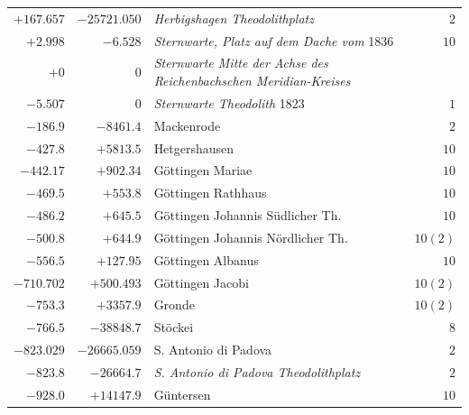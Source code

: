 \begin{center}
\begin{tabular}{r|r|p{170pt}|r}
\(+167.657\)&\(-25721.050\)&\textit{Herbigshagen Theodolithplatz}&\(2\)\\
\(+2.998\)&\(-6.528\)&\textit{Sternwarte, Platz auf dem Dache vom} 1836&\(10\)\\
\(+0\)&\(0\)&\textit{Sternwarte Mitte der Achse des Reichenbachschen Meridian-Kreises}&\\
\(-5.507\)&\(0\)&\textit{Sternwarte Theodolith} 1823&\(1\)\\
\(-186.9\)&\(-8461.4\)&Mackenrode&\(2\)\\
\(-427.8\)&\(+5813.5\)&Hetgershausen&\(10\)\\
\(-442.17\)&\(+902.34\)&Göttingen Mariae&\(10\)\\
\(-469.5\)&\(+553.8\)&Göttingen Rathhaus&\(10\)\\
\(-486.2\)&\(+645.5\)&Göttingen Johannis Südlicher Th.&\(10\)\\
\(-500.8\)&\(+644.9\)&Göttingen Johannis Nördlicher Th.&\(10(2)\)\\
\(-556.5\)&\(+127.95\)&Göttingen Albanus&\(10\)\\
\(-710.702\)&\(+500.493\)&Göttingen Jacobi&\(10(2)\)\\
\(-753.3\)&\(+3357.9\)&Gronde&\(10(2)\)\\
\(-766.5\)&\(-38848.7\)&Stöckei&\(8\)\\
\(-823.029\)&\(-26665.059\)&S. Antonio di Padova&\(2\)\\
\(-823.8\)&\(-26664.7\)&\textit{S. Antonio di Padova Theodolithplatz}&\(2\)\\
\(-928.0\)&\(+14147.9\)&Güntersen&\(10\)\\
\hline\end{tabular}\endgroup\end{center}
